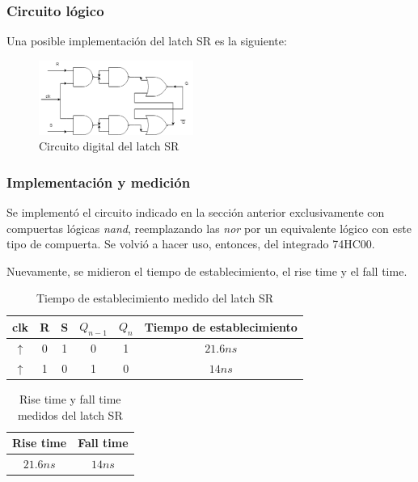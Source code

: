 \documentclass[../../e3_tp2_main.tex]{subfiles}
\begin{document}
\subsubsection{Circuito lógico}
Una posible implementación del latch SR es la siguiente:
\begin{figure}[H]	
	\centering
	\includegraphics[width=0.45\textwidth]{imagenes/lsr_cd.png}
	\caption{Circuito digital del latch SR}
\end{figure}

\subsubsection{Implementación y medici\'on}
Se implementó el circuito indicado en la sección anterior exclusivamente con compuertas lógicas \textit{nand}, reemplazando las \textit{nor} por un equivalente l\'ogico con este tipo de compuerta. Se volvi\'o a hacer uso, entonces, del integrado 74HC00.\par

Nuevamente, se midieron el tiempo de establecimiento, el rise time y el fall time. 

\begin{table}[H]
\begin{center}
\begin{tabular}{|c|c|c|c|c|c|}
\hline
clk& R&S & $Q_{n-1}$ & $Q_n$ &Tiempo de establecimiento\\
\hline \hline
$\uparrow$ &0 & 1 &0&1&$21.6 n s$  \\ \hline
$\uparrow$ &1 & 0 &1&0&$14 n s$  \\ \hline

\end{tabular}
\caption{Tiempo de establecimiento medido del latch SR} 
\end{center}
\end{table}

\begin{table}[H]
\begin{center}
\begin{tabular}{|c|c|}
\hline
Rise time& Fall time \\
\hline \hline
$21.6 n s$  & $14 n s$ \\ \hline
\end{tabular}
\caption{Rise time y fall time medidos del latch SR} 
\end{center}
\end{table}
\end{document}
